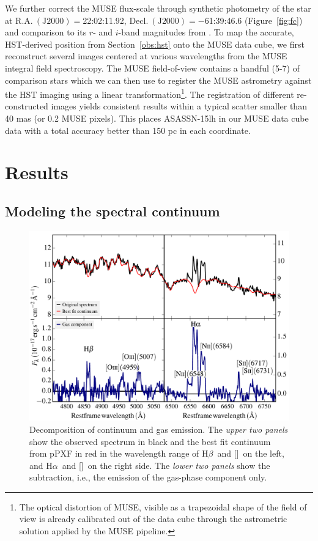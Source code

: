 \documentclass[traditabstract]{aa}
\newcommand{\hb}{H$\beta$}
\newcommand{\ha}{H$\alpha$}
\newcommand{\oiii}{[\ion{O}{iii}]}
\newcommand{\nii}{[\ion{N}{ii}]}
\begin{document}
We further correct the MUSE flux-scale through synthetic photometry of the star at $\mathrm{R.A.~(J2000)}=$22:02:11.92, $\mathrm{Decl.~(J2000)} = -$61:39:46.6 (Figure~\ref{fig:fc}) and comparison to its $r$- and $i$-band magnitudes from \citet{2016NatAs...1E...2L}. To map the accurate, HST-derived position from Section~\ref{obs:hst} onto the MUSE data cube, we first reconstruct several images centered at various wavelengths from the MUSE integral field spectroscopy. The MUSE field-of-view contains a handful (5-7) of comparison stars which we can then use to register the MUSE astrometry against the HST imaging using a linear transformation\footnote{The optical distortion of MUSE, visible as a trapezoidal shape of the field of view is already calibrated out of the data cube through the   astrometric solution applied by the MUSE pipeline.}. The registration of different re-constructed images yields consistent results within a typical scatter smaller than 40 mas (or 0.2 MUSE pixels). This places ASASSN-15lh in our MUSE data cube data with a total accuracy better than 150 pc in each coordinate.

\section{Results}
\label{sec:Res}

\subsection{Modeling the spectral continuum}

\begin{figure}
  \includegraphics[width=0.999\linewidth]{fig/MUSE_stargas.pdf}
\caption{Decomposition of continuum and gas emission. The \textit{upper two panels} show the observed spectrum in black and the best fit continuum from pPXF in red in the wavelength range of \hb~and \oiii~on the left, and \ha~and \nii~on the right side. The \textit{lower two panels} show the subtraction, i.e., the emission of the gas-phase component only.}
\label{fig:stargas}
\end{figure}
\end{document}
